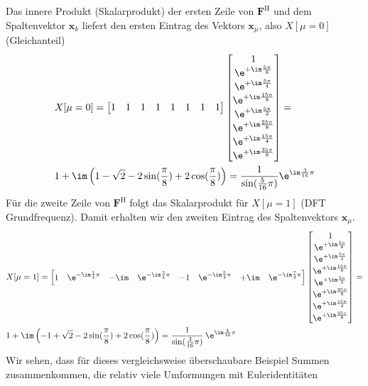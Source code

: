 \begin{ExCalc}
Das innere Produkt (Skalarprodukt) der ersten Zeile von $\bm{F}^\mathrm{H}$ und dem
Spaltenvektor $\bm{x}_k$ liefert den ersten Eintrag des Vektors $\bm{x}_\mu$, also
$X[\mu=0]$ (Gleichanteil)
\begin{align}
&X[\mu=0] =
\begin{bmatrix}
1 & 1 & 1 & 1 & 1 & 1 & 1 & 1
\end{bmatrix}
\begin{bmatrix}
1\\
\e^{+\im \frac{5\pi}{8}}\\
\e^{+\im \frac{5\pi}{4}}\\
\e^{+\im \frac{15\pi}{8}}\\
\e^{+\im \frac{5\pi}{2}}\\
\e^{+\im \frac{25\pi}{8}}\\
\e^{+\im \frac{15\pi}{4}}\\
\e^{+\im \frac{35\pi}{8}}
\end{bmatrix}
=\\
&1 + \im \left(1 - \sqrt{2} - 2\sin(\frac{\pi}{8}) + 2\cos(\frac{\pi}{8})\right)
= \frac{1}{\sin(\frac{5}{16}\pi)} \e^{\im\frac{3}{16}\pi}
\end{align}
%
Für die zweite Zeile von $\bm{F}^\mathrm{H}$ folgt das Skalarprodukt für
$X[\mu=1]$ (DFT Grundfrequenz). Damit erhalten wir den zweiten Eintrag des
Spaltenvektors $\bm{x}_\mu$.
\begin{align}
&X[\mu=1] =
\begin{bmatrix}
1 & \e^{-\im\frac{1}{4}\pi} & -\im & \e^{-\im\frac{3}{4}\pi} & -1 & \e^{-\im\frac{5}{4}\pi} & +\im & \e^{-\im\frac{7}{4}\pi}
\end{bmatrix}
\begin{bmatrix}
1\\
\e^{+\im \frac{5\pi}{8}}\\
\e^{+\im \frac{5\pi}{4}}\\
\e^{+\im \frac{15\pi}{8}}\\
\e^{+\im \frac{5\pi}{2}}\\
\e^{+\im \frac{25\pi}{8}}\\
\e^{+\im \frac{15\pi}{4}}\\
\e^{+\im \frac{35\pi}{8}}
\end{bmatrix}
=\\
&1 + \im \left(-1 + \sqrt{2} - 2\sin(\frac{\pi}{8}) + 2\cos(\frac{\pi}{8})\right)=
\frac{1}{\sin(\frac{3}{16}\pi)}\,\e^{\im\frac{5}{16}\pi}
\end{align}
%
Wir sehen, dass für dieses vergleichsweise überschaubare Beispiel
Summen zusammenkommen, die relativ viele Umformungen mit Euleridentitäten

\end{ExCalc}

